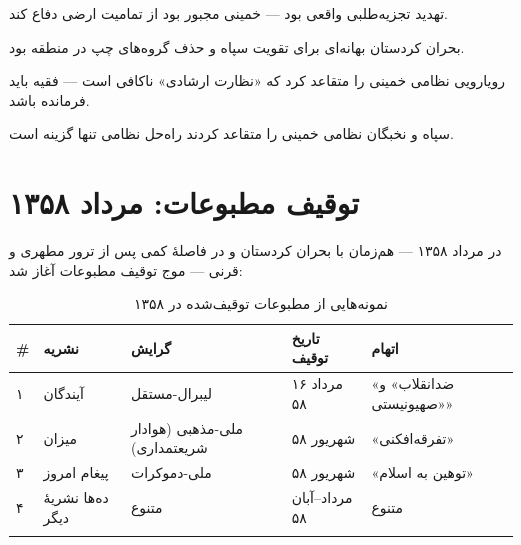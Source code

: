 \documentclass[12pt,a4paper]{book}
\begin{document}
\begin{warningBox}
\begin{description}[style=nextline, font=\bfseries\color{cPrimary}]
    \item[تز ۱:] تهدید تجزیه‌طلبی واقعی بود — خمینی مجبور بود از تمامیت ارضی دفاع کند.
    \item[تز ۲:] بحران کردستان بهانه‌ای برای تقویت سپاه و حذف گروه‌های چپ در منطقه بود.
    \item[تز ۳:] رویارویی نظامی خمینی را متقاعد کرد که «نظارت ارشادی» ناکافی است — فقیه باید فرمانده باشد.
    \item[تز ۴:] سپاه و نخبگان نظامی خمینی را متقاعد کردند راه‌حل نظامی تنها گزینه است.
\end{description}
\end{warningBox}

\section{توقیف مطبوعات: مرداد ۱۳۵۸}

در مرداد ۱۳۵۸ — هم‌زمان با بحران کردستان و در فاصلهٔ کمی پس از ترور مطهری و قرنی — موج توقیف مطبوعات آغاز شد:

\begin{longtable}{%
    >{\centering\arraybackslash}p{}
    >{\raggedleft\arraybackslash}p{}
    >{\raggedleft\arraybackslash}p{}
    >{\raggedleft\arraybackslash}p{}
    >{\raggedleft\arraybackslash}p{}}
\toprule
\rowcolor{cPrimary!10}
\textbf{\#} & \textbf{نشریه} & \textbf{گرایش} & \textbf{تاریخ توقیف} & \textbf{اتهام} \\
\midrule
\endhead

۱ & آیندگان & لیبرال-مستقل & ۱۶ مرداد ۵۸ & «ضدانقلاب» و «صهیونیستی» \\
\midrule

۲ & میزان & ملی-مذهبی (هوادار شریعتمداری) & شهریور ۵۸ & «تفرقه‌افکنی» \\
\midrule

۳ & پیغام امروز & ملی-دموکرات & شهریور ۵۸ & «توهین به اسلام» \\
\midrule

۴ & ده‌ها نشریهٔ دیگر & متنوع & مرداد–آبان ۵۸ & متنوع \\

\bottomrule
\caption{نمونه‌هایی از مطبوعات توقیف‌شده در ۱۳۵۸}
\label{tab:press-closures}
\end{longtable}
\end{document}
